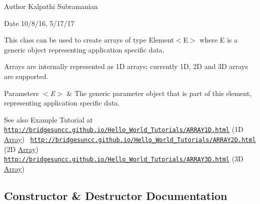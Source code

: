 \begin{DoxyAuthor}{Author}
Kalpathi Subramanian
\end{DoxyAuthor}
\begin{DoxyDate}{Date}
10/8/16, 5/17/17
\end{DoxyDate}
This class can be used to create arrays of type Element$<$\+E$>$ where E is a generic object representing application specific data.

Arrays are internally represented as 1\+D arrays; currently 1\+D, 2\+D and 3\+D arrays are supported.


\begin{DoxyParams}{Parameters}
{\em $<$\+E$>$} & The generic parameter object that is part of this element, representing application specific data.\\
\hline
\end{DoxyParams}
\begin{DoxySeeAlso}{See also}
Example Tutorial at ~\newline
 \href{http://bridgesuncc.github.io/Hello_World_Tutorials/ARRAY1D.html}{\tt http\+://bridgesuncc.\+github.\+io/\+Hello\+\_\+\+World\+\_\+\+Tutorials/\+A\+R\+R\+A\+Y1\+D.\+html} (1\+D \hyperlink{class_array_1_1_array}{Array})~\newline
 \href{http://bridgesuncc.github.io/Hello_World_Tutorials/ARRAY2D.html}{\tt http\+://bridgesuncc.\+github.\+io/\+Hello\+\_\+\+World\+\_\+\+Tutorials/\+A\+R\+R\+A\+Y2\+D.\+html} (2\+D \hyperlink{class_array_1_1_array}{Array})~\newline
 \href{http://bridgesuncc.github.io/Hello_World_Tutorials/ARRAY3D.html}{\tt http\+://bridgesuncc.\+github.\+io/\+Hello\+\_\+\+World\+\_\+\+Tutorials/\+A\+R\+R\+A\+Y3\+D.\+html} (3\+D \hyperlink{class_array_1_1_array}{Array}) 
\end{DoxySeeAlso}


\subsection{Constructor \& Destructor Documentation}
\hypertarget{class_array_1_1_array_a35f27607f31ccfdede99590a30dc461c}{}
